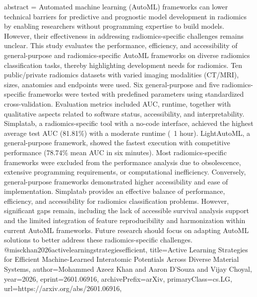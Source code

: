 {      abstract = {Automated machine learning (AutoML) frameworks can lower technical barriers for predictive and prognostic model development in radiomics by enabling researchers without programming expertise to build models. However, their effectiveness in addressing radiomics-specific challenges remains unclear. This study evaluates the performance, efficiency, and accessibility of general-purpose and radiomics-specific AutoML frameworks on diverse radiomics classification tasks, thereby highlighting development needs for radiomics. Ten public/private radiomics datasets with varied imaging modalities (CT/MRI), sizes, anatomies and endpoints were used. Six general-purpose and five radiomics-specific frameworks were tested with predefined parameters using standardized cross-validation. Evaluation metrics included AUC, runtime, together with qualitative aspects related to software status, accessibility, and interpretability. Simplatab, a radiomics-specific tool with a no-code interface, achieved the highest average test AUC (81.81\%) with a moderate runtime (~1 hour). LightAutoML, a general-purpose framework, showed the fastest execution with competitive performance (78.74\% mean AUC in six minutes). Most radiomics-specific frameworks were excluded from the performance analysis due to obsolescence, extensive programming requirements, or computational inefficiency. Conversely, general-purpose frameworks demonstrated higher accessibility and ease of implementation. Simplatab provides an effective balance of performance, efficiency, and accessibility for radiomics classification problems. However, significant gaps remain, including the lack of accessible survival analysis support and the limited integration of feature reproducibility and harmonization within current AutoML frameworks. Future research should focus on adapting AutoML solutions to better address these radiomics-specific challenges.}
}@misc{khan2026activelearningstrategiesefficient,
      title={Active Learning Strategies for Efficient Machine-Learned Interatomic Potentials Across Diverse Material Systems}, 
      author={Mohammed Azeez Khan and Aaron D'Souza and Vijay Choyal},
      year={2026},
      eprint={2601.06916},
      archivePrefix={arXiv},
      primaryClass={cs.LG},
      url={https://arxiv.org/abs/2601.06916},
}
